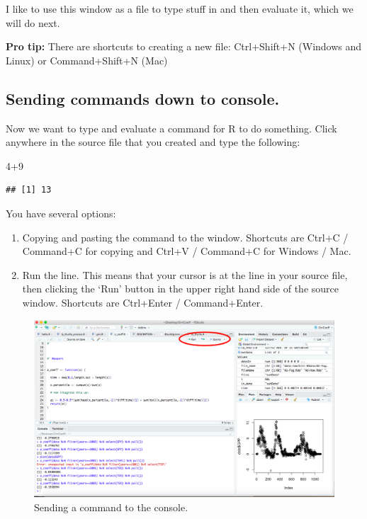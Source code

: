 \documentclass[
]{book}
\newenvironment{Shaded}{\begin{snugshade}}{\end{snugshade}}
\newcommand{\DecValTok}[1]{\textcolor[rgb]{0.00,0.00,0.81}{#1}}
\newcommand{\SpecialCharTok}[1]{\textcolor[rgb]{0.00,0.00,0.00}{#1}}
\providecommand{\tightlist}{%
  \setlength{\itemsep}{0pt}\setlength{\parskip}{0pt}}
\theoremstyle{definition}
\theoremstyle{definition}
\theoremstyle{definition}
\theoremstyle{remark}
\begin{document}
I like to use this window as a file to type stuff in and then evaluate it, which we will do next.

\textbf{Pro tip:} There are shortcuts to creating a new file: Ctrl+Shift+N (Windows and Linux) or Command+Shift+N (Mac)

\hypertarget{sending-commands-down-to-console.}{%
\subsection{Sending commands down to console.}\label{sending-commands-down-to-console.}}

Now we want to type and evaluate a command for R to do something. Click anywhere in the source file that you created and type the following:

\begin{Shaded}
\begin{Highlighting}[]
\DecValTok{4}\SpecialCharTok{+}\DecValTok{9}
\end{Highlighting}
\end{Shaded}

\begin{verbatim}
## [1] 13
\end{verbatim}

You have several options:

\begin{enumerate}
\def\labelenumi{\arabic{enumi}.}
\tightlist
\item
  Copying and pasting the command to the window. Shortcuts are Ctrl+C / Command+C for copying and Ctrl+V / Command+C for Windows / Mac.
\item
  Run the line. This means that your cursor is at the line in your source file, then clicking the `Run' button in the upper right hand side of the source window. Shortcuts are Ctrl+Enter / Command+Enter.
\end{enumerate}

\begin{figure}

{\centering \includegraphics[width=5in]{figures/02-intro/rStudio-pane-source} 

}

\caption{Sending a command to the console.}\label{fig:unnamed-chunk-15}
\end{figure}
\end{document}
